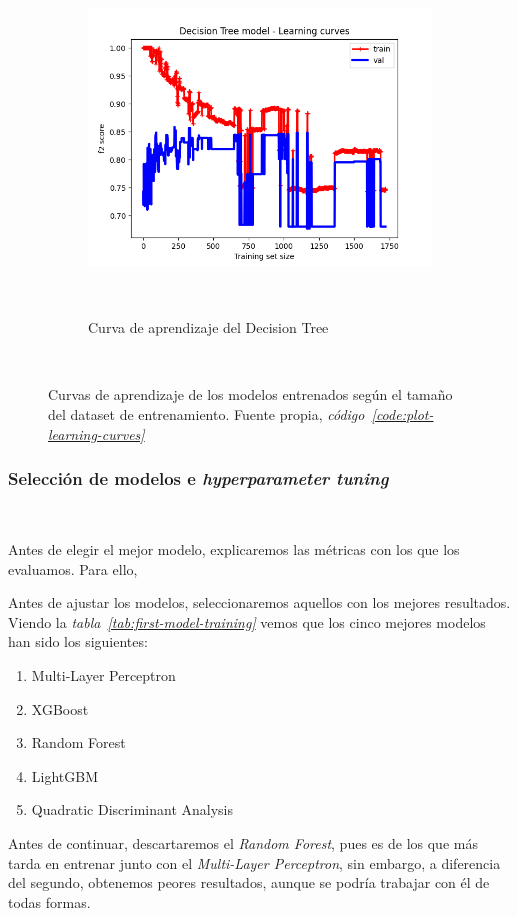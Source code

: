 \begin{figure}[!ht]
\begin{subfigure}[b]{0.3\textwidth}
        \includegraphics[width=\linewidth]{media/images/learning-curves/dt.png}
        \caption{Curva de aprendizaje del Decision Tree}\ \label{sfig:lc-dt}
    \end{subfigure}
    \caption{Curvas de aprendizaje de los modelos entrenados según el tamaño del \gls{dataset} de entrenamiento. Fuente propia, \textit{código\ \ref{code:plot-learning-curves}}}\ \label{fig:learning-curves}
\end{figure}


\subsubsection{Selección de modelos e \textit{hyperparameter tuning}}\ \label{sec:i1-seleccion}

Antes de elegir el mejor modelo, explicaremos las métricas con los que los evaluamos. Para ello, 

Antes de ajustar los modelos, seleccionaremos aquellos con los mejores resultados. Viendo la \textit{tabla\ \ref{tab:first-model-training}} vemos que los cinco mejores modelos han sido los siguientes:
\begin{enumerate}
    \item Multi-Layer Perceptron
    \item XGBoost
    \item Random Forest
    \item LightGBM
    \item Quadratic Discriminant Analysis
\end{enumerate}

Antes de continuar, descartaremos el \textit{Random Forest}, pues es de los que más tarda en entrenar junto con el \textit{Multi-Layer Perceptron}, sin embargo, a diferencia del segundo, obtenemos peores resultados, aunque se podría trabajar con él de todas formas.

